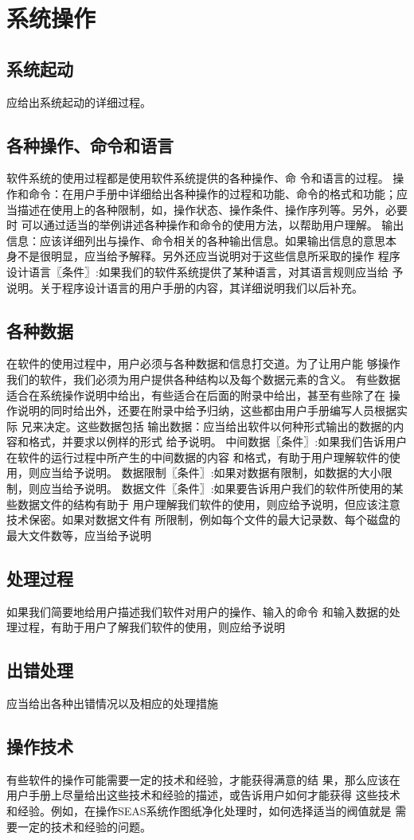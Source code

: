 \chapter{系统操作}
\section{系统起动}
应给出系统起动的详细过程。
\section{各种操作、命令和语言}
软件系统的使用过程都是使用软件系统提供的各种操作、命
令和语言的过程。
操作和命令：在用户手册中详细给出各种操作的过程和功能、命令的格式和功能；应
当描述在使用上的各种限制，如，操作状态、操作条件、操作序列等。另外，必要时
可以通过适当的举例讲述各种操作和命令的使用方法，以帮助用户理解。
输出信息：应该详细列出与操作、命令相关的各种输出信息。如果输出信息的意思本
身不是很明显，应当给予解释。另外还应当说明对于这些信息所采取的操作
程序设计语言〖条件〗:如果我们的软件系统提供了某种语言，对其语言规则应当给
予说明。关于程序设计语言的用户手册的内容，其详细说明我们以后补充。
\section{各种数据}在软件的使用过程中，用户必须与各种数据和信息打交道。为了让用户能
够操作我们的软件，我们必须为用户提供各种结构以及每个数据元素的含义。
有些数据适合在系统操作说明中给出，有些适合在后面的附录中给出，甚至有些除了在
操作说明的同时给出外，还要在附录中给予归纳，这些都由用户手册编写人员根据实际
兄来决定。这些数据包括
输出数据：应当给出软件以何种形式输出的数据的内容和格式，并要求以例样的形式
给予说明。
中间数据〖条件〗:如果我们告诉用户在软件的运行过程中所产生的中间数据的内容
和格式，有助于用户理解软件的使用，则应当给予说明。
数据限制〖条件〗:如果对数据有限制，如数据的大小限制，则应当给予说明。
数据文件〖条件〗:如果要告诉用户我们的软件所使用的某些数据文件的结构有助于
用户理解我们软件的使用，则应给予说明，但应该注意技术保密。如果对数据文件有
所限制，例如每个文件的最大记录数、每个磁盘的最大文件数等，应当给予说明
\section{处理过程}
如果我们简要地给用户描述我们软件对用户的操作、输入的命令
和输入数据的处理过程，有助于用户了解我们软件的使用，则应给予说明
\section{出错处理}
应当给出各种出错情况以及相应的处理措施
\section{操作技术}
有些软件的操作可能需要一定的技术和经验，才能获得满意的结
果，那么应该在用户手册上尽量给出这些技术和经验的描述，或告诉用户如何才能获得
这些技术和经验。例如，在操作SEAS系统作图纸净化处理时，如何选择适当的阀值就是
需要一定的技术和经验的问题。